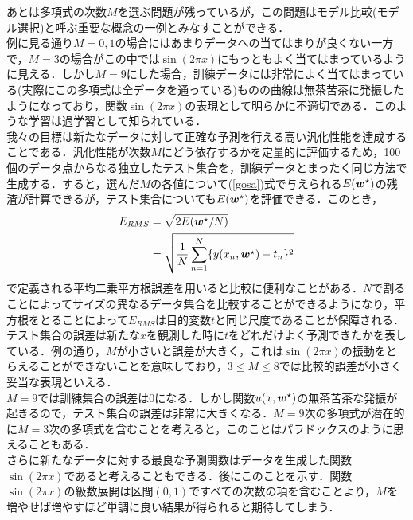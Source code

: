 \documentclass[a4j,11pt]{jsarticle}
\newcommand{\bw}{\mbox{\boldmath {$w$}}}
\numberwithin{equation}{section}
\begin{document}
あとは多項式の次数$M$を選ぶ問題が残っているが，この問題はモデル比較(モデル選択)と呼ぶ重要な概念の一例とみなすことができる．\\

例に見る通り$M=0,1$の場合にはあまりデータへの当てはまりが良くない一方で，$M=3$の場合がこの中では$\sin(2\pi x)$にもっともよく当てはまっているように見える．しかし$M=9$にした場合，訓練データには非常によく当てはまっている(実際にこの多項式は全データを通っている)ものの曲線は無茶苦茶に発振したようになっており，関数$\sin(2\pi x)$の表現として明らかに不適切である．このような学習は過学習として知られている．\\

我々の目標は新たなデータに対して正確な予測を行える高い汎化性能を達成することである．汎化性能が次数$M$にどう依存するかを定量的に評価するため，100個のデータ点からなる独立したテスト集合を，訓練データとまったく同じ方法で生成する．すると，選んだ$M$の各値について(\ref{gosa})式で与えられる$E(\bw^{\star})$の残渣が計算できるが，テスト集合についても$E(\bw^{\star})$を評価できる．このとき，
\begin{equation}
\begin{split}
  E_{RMS}&=\sqrt{2E(\bw^{\star}/N)}\\
          &= \sqrt{\frac{1}{N}\sum_{n=1}^N \{y(x_n,\bw^{\star}) - t_n\}^2}
\end{split}
\end{equation}
で定義される平均二乗平方根誤差を用いると比較に便利なことがある．$N$で割ることによってサイズの異なるデータ集合を比較することができるようになり，平方根をとることによって$E_{RMS}$は目的変数$t$と同じ尺度であることが保障される．テスト集合の誤差は新たな$x$を観測した時に$t$をどれだけよく予測できたかを表している．例の通り，$M$が小さいと誤差が大きく，これは$\sin(2\pi x)$の振動をとらえることができないことを意味しており，$3\leq M\leq 8$では比較的誤差が小さく妥当な表現といえる．\\

$M=9$では訓練集合の誤差は$0$になる．しかし関数$u(x,\bw^{\star})$の無茶苦茶な発振が起きるので，テスト集合の誤差は非常に大きくなる．$M=9$次の多項式が潜在的に$M=3$次の多項式を含むことを考えると，このことはパラドックスのように思えることもある．\\
さらに新たなデータに対する最良な予測関数はデータを生成した関数$\sin (2\pi x)$であると考えることもできる．後にこのことを示す．関数$\sin (2\pi x)$の級数展開は区間$(0,1)$ですべての次数の項を含むことより，$M$を増やせば増やすほど単調に良い結果が得られると期待してしまう．\\
\end{document}
